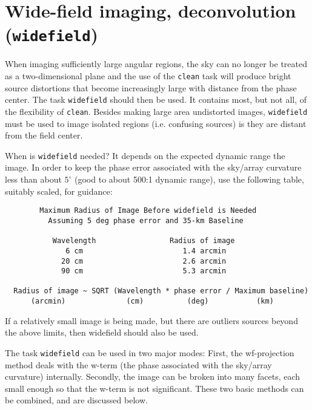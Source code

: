 \documentclass[11pt]{report}
\begin{document}
\section{Wide-field imaging, deconvolution ({\tt widefield})}
\label{section:im.widefield}

When imaging sufficiently large angular regions, the sky can no longer
be treated as a two-dimensional plane and the use of the {\tt clean}
task will produce bright source distortions that become
increasingly large with distance from the phase center.  The task
{\tt widefield} should then be used.  It contains most, but not all,
of the flexibility of {\tt clean}.  Besides making large area
undistorted images, {\tt widefield} must be used to image isolated
regions (i.e. confusing sources) is they are distant from the field
center.

When is {\tt widefield} needed?  It depends on the expected dynamic
range the image.  In order to keep the phase error associated with the
sky/array curvature less than about $5^\circ$ (good to about 500:1
dynamic range), use the following table, suitably scaled, for
guidance:

\scriptsize
\begin{verbatim}
        Maximum Radius of Image Before widefield is Needed
          Assuming 5 deg phase error and 35-km Baseline

           Wavelength                 Radius of image
              6 cm                       1.4 arcmin
             20 cm                       2.6 arcmin
             90 cm                       5.3 arcmin

  Radius of image ~ SQRT (Wavelength * phase error / Maximum baseline)
      (arcmin)              (cm)          (deg)           (km)
\end{verbatim}
\normalsize

\noindent If a relatively small image is being made, but there are outliers
sources beyond the above limits, then widefield should also be used.

The task {\tt widefield} can be used in two major modes: First, the
wf-projection method deals with the w-term (the phase associated with
the sky/array curvature) internally.  Secondly, the image can be
broken into many facets, each small enough so that the w-term is not
significant.  These two basic methods can be combined, and are discussed
below.
\end{document}
